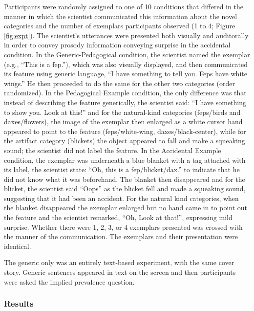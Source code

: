 \documentclass[10pt,letterpaper]{article}
\begin{document}
Participants were randomly assigned to one of 10 conditions that differed in the manner in which the scientist communicated this information about the novel categories and the number of exemplars participants observed (1 to 4; Figure \ref{fig:expt}). The scientist's utterances were presented both visually and auditorally in order to convey prosody information conveying surprise in the accidental condition.
In the Generic-Pedagogical condition, the scientist named the exemplar (e.g., ``This is a fep.''), which was also visually displayed, and then communicated its feature using generic language, ``I have something to tell you. Feps have white wings.'' He then proceeded to do the same for the other two categories (order randomized). In the Pedagogical Example condition, the only difference was that instead of describing the feature generically, the scientist said: ``I have something to show you. Look at this!'' and for the natural-kind categories (feps/birds and daxes/flowers), the image of the exemplar then enlarged as a white cursor hand appeared to point to the feature (feps/white-wing, daxes/black-center), while for the artifact category (blickets) the object appeared to fall and make a squeaking sound; the scientist did not label the feature. In the Accidental Example condition, the exemplar was underneath a blue blanket with a tag attached with its label, the scientist state: ``Oh, this is a fep/blicket/dax.'' to indicate that he did not know what it was beforehand. The blanket then disappeared and for the blicket, the scientist said ``Oops'' as the blicket fell and made a squeaking sound, suggesting that it had been an accident. For the natural kind categories, when the blanket disappeared the exemplar enlarged but no hand came in to point out the feature and the scientist remarked, ``Oh, Look at that!'', expressing mild surprise. Whether there were 1, 2, 3, or 4 exemplars presented was crossed with the manner of the communication. The exemplars and their presentation were identical.

The generic only was an entirely text-based experiment, with the same cover story. Generic sentences appeared in text on the screen and then participants were asked the implied prevalence question.

\subsubsection{Results}
\end{document}
